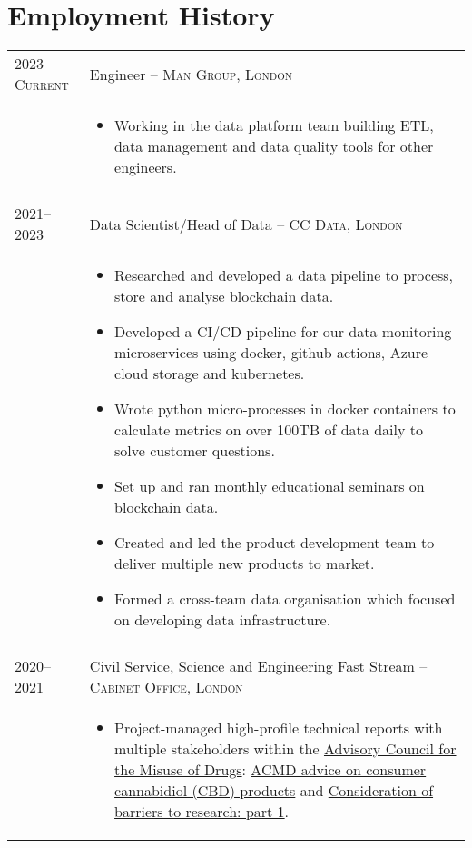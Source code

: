 \documentclass[a4paper,10pt]{article}
\begin{document}
\section{Employment History}
\begin{tabular}{p{2.25cm}|p{15cm}}
\textsc{2023--Current} & \large{Engineer -- \textsc{Man Group, London}}\\
	& \vspace{-0.07 in}\begin{itemize}
		\item Working in the data platform team building ETL, data management
		and data quality tools for other engineers.
	\end{itemize}\vspace{-0.15 in}\\
\multicolumn{2}{c}{}\\
	\textsc{2021--2023} & \large{Data Scientist/Head of Data -- \textsc{CC Data, London}}\\
	 & \vspace{-0.07 in}\begin{itemize}
	 	\item Researched and developed a data pipeline to process, store and analyse blockchain data.
		\item Developed a CI/CD pipeline for our data monitoring microservices using docker, github actions, Azure cloud storage and kubernetes.
		\item Wrote python micro-processes in docker containers to calculate metrics on over 100TB of data daily to solve customer questions.
		\item Set up and ran monthly educational seminars on blockchain data.
		\item Created and led the product development team to deliver multiple new products to market.
		\item Formed a cross-team data organisation which focused on developing data infrastructure.
	\end{itemize}\vspace{-0.15 in}\\
\multicolumn{2}{c}{}\\
%
%
	\textsc{2020--2021} & \large{Civil Service, Science and Engineering Fast Stream -- \textsc{Cabinet Office, London}}\\
 	 & \vspace{-0.07 in}\begin{itemize}
 	 	\item Project-managed high-profile technical reports with multiple stakeholders within the \href{https://www.gov.uk/government/organisations/advisory-council-on-the-misuse-of-drugs}{Advisory Council for the Misuse of Drugs}: \href{https://www.gov.uk/government/publications/acmd-advice-on-consumer-cannabidiol-cbd-products}{ACMD advice on consumer cannabidiol (CBD) products} and \href{https://www.gov.uk/government/publications/consideration-of-barriers-to-research-part-1}{Consideration of barriers to research: part 1}.

\end{itemize}
\end{tabular}
\end{document}
